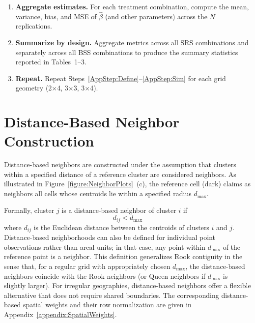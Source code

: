 \documentclass{article}[11pt]
\begin{document}
\begin{enumerate}
    \item \textbf{Aggregate estimates.} For each treatment combination, compute the mean, variance, bias, and MSE of $\hat\beta$ (and other parameters) across the $N$ replications.

    \item \textbf{Summarize by design.} Aggregate metrics across all SRS combinations and separately across all BSS combinations to produce the summary statistics reported in Tables~1--3.

    \item\label{AppStep:Repeat} \textbf{Repeat.} Repeat Steps~\ref{AppStep:Define}--\ref{AppStep:Sim} for each grid geometry (2$\times$4, 3$\times$3, 3$\times$4).
\end{enumerate}

\section{Distance-Based Neighbor Construction}\label{appendix:DistanceBased}

Distance-based neighbors\cite{fotheringham_sage_2009} are constructed under the assumption that clusters within a specified distance of a reference cluster are considered neighbors. As illustrated in Figure~\ref{figure:NeighborPlots}~(c), the reference cell (dark) claims as neighbors all cells whose centroids lie within a specified radius $d_{\max}$.

Formally, cluster $j$ is a distance-based neighbor of cluster $i$ if
\begin{equation}
    d_{ij} < d_{\max}
\end{equation}
where $d_{ij}$ is the Euclidean distance between the centroids of clusters $i$ and $j$. Distance-based neighborhoods can also be defined for individual point observations rather than areal units; in that case, any point within $d_{\max}$ of the reference point is a neighbor. This definition generalizes Rook contiguity in the sense that, for a regular grid with appropriately chosen $d_{\max}$, the distance-based neighbors coincide with the Rook neighbors (or Queen neighbors if $d_{\max}$ is slightly larger). For irregular geographies, distance-based neighbors offer a flexible alternative that does not require shared boundaries. The corresponding distance-based spatial weights and their row normalization are given in Appendix~\ref{appendix:SpatialWeights}.
\end{document}
